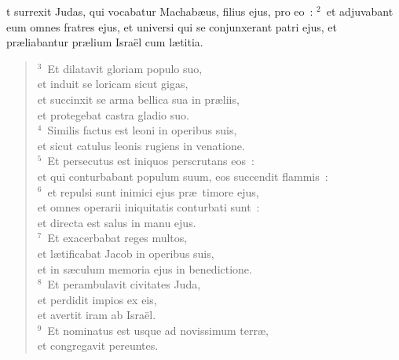 \bchapter
{}t surrexit Judas, qui vocabatur Machab\ae us, filius ejus, pro eo~:
${}^{2}$~et adjuvabant eum omnes fratres ejus, et universi qui se conjunxerant patri ejus, et pr\ae liabantur pr\ae lium Isra\"el cum l\ae titia.
\begin{flushleft}\begin{verse}${}^{3}$~Et dilatavit gloriam populo suo,\\ et induit se loricam sicut gigas,\\ et succinxit se arma bellica sua in pr\ae liis,\\ et protegebat castra gladio suo.\\
${}^{4}$~Similis factus est leoni in operibus suis,\\ et sicut catulus leonis rugiens in venatione.\\
${}^{5}$~Et persecutus est iniquos perscrutans eos~:\\ et qui conturbabant populum suum, eos succendit flammis~:\\
${}^{6}$~et repulsi sunt inimici ejus pr\ae\ timore ejus,\\ et omnes operarii iniquitatis conturbati sunt~:\\ et directa est salus in manu ejus.\\
${}^{7}$~Et exacerbabat reges multos,\\ et l\ae tificabat Jacob in operibus suis,\\ et in s\ae culum memoria ejus in benedictione.\\
${}^{8}$~Et perambulavit civitates Juda,\\ et perdidit impios ex eis,\\ et avertit iram ab Isra\"el.\\
${}^{9}$~Et nominatus est usque ad novissimum terr\ae ,\\ et congregavit pereuntes.\end{verse}\end{flushleft}


